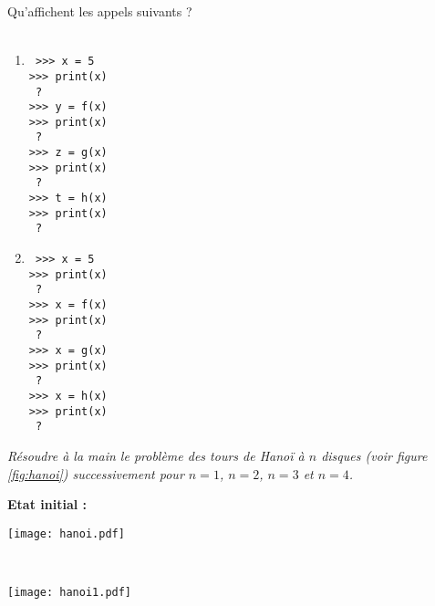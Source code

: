 \begin{td}
Qu'affichent les appels suivants ?\\
\mbox{}\\
\begin{minipage}{3.5cm}
\begin{enumerate}
\item 
\begin{py}{2.5cm}\tt
>>> x = 5\\
>>> print(x)\\
{\color{red} ?}\\
>>> y = f(x)\\
>>> print(x)\\
{\color{red} ?}\\
>>> z = g(x)\\
>>> print(x)\\
{\color{red} ?}\\
>>> t = h(x)\\
>>> print(x)\\
{\color{red} ?}
\end{py}
\end{enumerate}
\end{minipage}
\hfill
\begin{minipage}{3.5cm}
\begin{enumerate}\setcounter{enumi}{1}
\item 
\begin{py}{2.5cm}\tt
>>> x = 5\\
>>> print(x)\\
{\color{red} ?}\\
>>> x = f(x)\\
>>> print(x)\\
{\color{red} ?}\\
>>> x = g(x)\\
>>> print(x)\\
{\color{red} ?}\\
>>> x = h(x)\\
>>> print(x)\\
{\color{red} ?}
\end{py}
\end{enumerate}
\end{minipage}
\end{td}


\begin{td}\label{td:hanoi}
\em
Résoudre {\em à la main} le problème des tours de Hanoï à $n$ disques
(voir figure \ref{fig:hanoi}) successivement 
pour $n=1$, $n=2$, $n=3$ et $n=4$.
\end{td}
\begin{fig}\label{fig:hanoi}
{\bf Etat initial :}\\
\centerline{\texttt{[image: hanoi.pdf]}}

\\
\centerline{\texttt{[image: hanoi1.pdf]}}
\end{fig}



